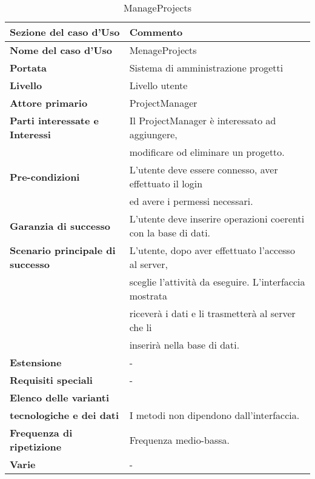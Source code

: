 \documentclass[12pt]{scrartcl}
\begin{document}
\begin{table}[h!]
  \caption{ManageProjects}
  \label{tab:table5}
  \begin{tabular}{|l|l|}
    \toprule
    \textbf{Sezione del caso d'Uso} & \textbf{Commento}\\
    \midrule
    \textbf{Nome del caso d'Uso} & MenageProjects\\
    \midrule
    \textbf{Portata} & Sistema di amministrazione progetti\\
    \midrule
    \textbf{Livello} & Livello utente\\
    \midrule
    \textbf{Attore primario} & ProjectManager\\
    \midrule
    \textbf{Parti interessate e Interessi} & Il ProjectManager \`e interessato ad aggiungere,
    \\& modificare od eliminare un progetto.\\
    \midrule
    \textbf{Pre-condizioni} & L'utente deve essere connesso, aver effettuato il login
    \\& ed avere i permessi necessari.\\
    \midrule
    \textbf{Garanzia di successo} & L'utente deve inserire operazioni coerenti con la base di dati.\\
    \midrule
    \textbf{Scenario principale di successo} & L'utente, dopo aver effettuato l'accesso al server,
    \\& sceglie l'attivit\`a da eseguire. L'interfaccia mostrata
    \\& ricever\`a i dati e li trasmetter\`a al server che li 
    \\& inserir\`a nella base di dati.\\
    \midrule
    \textbf{Estensione} & - \\
    \midrule
    \textbf{Requisiti speciali} & - \\
    \midrule
    \textbf{Elenco delle varianti}\\ \textbf{tecnologiche e dei dati} & I metodi non dipendono dall'interfaccia.\\
    \midrule
    \textbf{Frequenza di ripetizione} & Frequenza medio-bassa.\\
    \midrule
    \textbf{Varie} & - \\
    \bottomrule
  \end{tabular}
\end{table}
\end{document}

